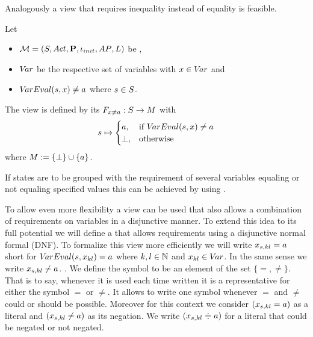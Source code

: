 \documentclass[preview]{standalone}
\begin{document}
Analogously a view that requires inequality instead of equality is feasible.

\begin{definition}
	Let
	\begin{itemize}
		\item $\chgph = \chgphtuple$ be \achgphN,
		\item $\vars$ be the respective set of variables with $\var \in \vars$ and
		\item $\vareval(\state, \var) \neq \varval$ where $\state \in \states$.		
	\end{itemize} 
	The view \viewparamvaluesneq is defined by its \grpfctN $\gfctparamvaluesneq : \states \to \imggrp$ with
	\[
	\state \mapsto
	\begin{cases}
		\varval, &\text{if } \vareval(\state, \var) \neq \varval\\
		\remelem, 	&\text{otherwise}
	\end{cases}
	\]
	where $\imggrp := \remset \cup \{a\}$.
\end{definition}

If states are to be grouped with the requirement of several variables equaling or not equaling specified values this can be achieved by using \parllcompN. 

To allow even more flexibility a view can be used that also allows a combination of requirements on variables in a disjunctive manner. To extend this idea to its full potential we will define a \viewN that allows requirements using a disjunctive normal formal (DNF). To formalize this view more efficiently we will write $\varstate[,kl] = \varval$ short for $\vareval(\state, \var_{kl}) = \varval$ where $k,l \in \natnums$ and $x_{kl} \in \vars$. In the same sense we write $\varstate[,kl] \neq \varval$. . We define the symbol \eqorneq to be an element of the set $\{=,\neq\}$. That is to say, whenever it is used each time written it is a representative for either the symbol $=$ or $\neq$. It allows to write one symbol whenever $=$ and $\neq$ could or should be possible. Moreover for this context we consider $(\varstate[,kl] = \varval)$ as a literal and $(\varstate[,kl] \neq \varval)$ as its negation. We write $(\varstate[,kl] \eqorneq \varval)$ for a literal that could be negated or not negated.
\end{document}
